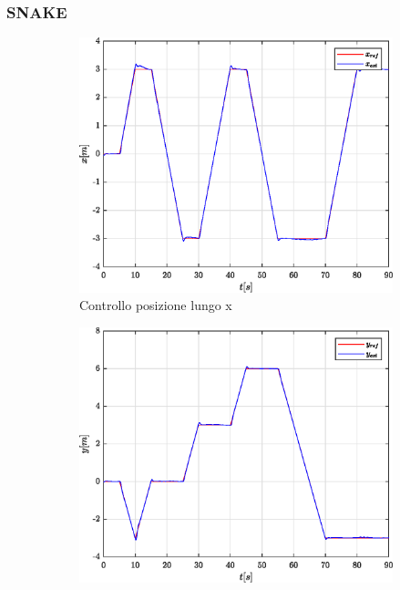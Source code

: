 \subsubsection{SNAKE}
\begin{figure}
	\centering
	\begin{subfigure}{0.45\textwidth}
		\centering
		\includegraphics[width=1\textwidth]{Simulazioni/Figure/SMC/SNAKE/PositionControlXPos}
		\caption{Controllo posizione lungo x}
	\end{subfigure}
	\hfill
	\begin{subfigure}{0.45\textwidth}
		\centering
		\includegraphics[width=1\textwidth]{Simulazioni/Figure/SMC/SNAKE/PositionControlYPos}

\end{subfigure}
\end{figure}
